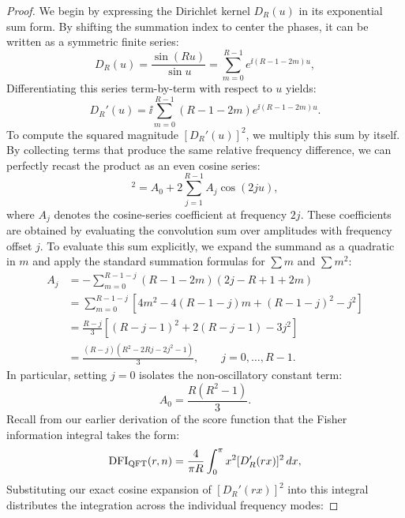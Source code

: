 \begin{proof}
    We begin by expressing the Dirichlet kernel $D_R(u)$ in its exponential sum form. By shifting the summation index to center the phases, it can be written as a symmetric finite series:
    \begin{equation}
        D_R(u)=\frac{\sin(Ru)}{\sin u}
        =
        \sum_{m=0}^{R-1}e^{\ii(R-1-2m)u},
    \end{equation}
    Differentiating this series term-by-term with respect to $u$ yields:
    \begin{equation}
        D_R'(u)
        =
        \ii\sum_{m=0}^{R-1}(R-1-2m)e^{\ii(R-1-2m)u}.
    \end{equation}
    To compute the squared magnitude $[D_R'(u)]^2$, we multiply this sum by itself. By collecting terms that produce the same relative frequency difference, we can perfectly recast the product as an even cosine series:
    \begin{equation}
        [D_R'(u)]^2
        =
        A_0 + 2\sum_{j=1}^{R-1}A_j\cos(2ju),
    \end{equation}
    where $A_j$ denotes the cosine-series coefficient at frequency $2j$. These
    coefficients are obtained by evaluating the convolution sum over amplitudes
    with frequency offset $j$. To evaluate this sum explicitly, we expand the
    summand as a quadratic in $m$ and apply the standard summation formulas for
    $\sum m$ and $\sum m^2$:
    \begin{align}
        A_j
        &= -\sum_{m=0}^{R-1-j} (R-1-2m)(2j-R+1+2m) \nonumber\\
        &= \sum_{m=0}^{R-1-j} \left[ 4m^2 - 4(R-1-j)m + (R-1-j)^2 - j^2 \right] \nonumber\\
        &= \frac{R-j}{3} \left[ (R-j-1)^2 + 2(R-j-1) - 3j^2 \right] \nonumber\\
        &= \frac{(R-j)(R^2-2Rj-2j^2-1)}{3}, \qquad j=0,\ldots,R-1.
    \end{align}
    In particular, setting $j=0$ isolates the non-oscillatory constant term:
    \begin{equation}
        A_0=\frac{R(R^2-1)}{3}.
    \end{equation}
    Recall from our earlier derivation of the score function that the Fisher information integral takes the form:
    \begin{equation}
        \mathrm{DFI}_{\mathrm{QFT}}(r,n)
        =
        \frac{4}{\pi R}\int_0^\pi x^2[D_R'(rx)]^2\,dx,
    \end{equation}
    Substituting our exact cosine expansion of $[D_R'(rx)]^2$ into this integral distributes the integration across the individual frequency modes:

\end{proof}

